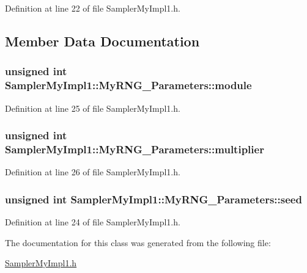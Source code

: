 Definition at line 22 of file Sampler\-My\-Impl1.\-h.



\subsection{Member Data Documentation}
\hypertarget{class_sampler_my_impl1_1_1_my_r_n_g___parameters_a7e4c25cb935ac5ecd7732028dbe4541f}{
\subsubsection[{module}]{\setlength{\rightskip}{0pt plus 5cm}unsigned int Sampler\-My\-Impl1\-::\-My\-R\-N\-G\-\_\-\-Parameters\-::module}}\label{class_sampler_my_impl1_1_1_my_r_n_g___parameters_a7e4c25cb935ac5ecd7732028dbe4541f}


Definition at line 25 of file Sampler\-My\-Impl1.\-h.

\hypertarget{class_sampler_my_impl1_1_1_my_r_n_g___parameters_a5038aa739c1c072931154d7d8c1a8cb0}{
\subsubsection[{multiplier}]{\setlength{\rightskip}{0pt plus 5cm}unsigned int Sampler\-My\-Impl1\-::\-My\-R\-N\-G\-\_\-\-Parameters\-::multiplier}}\label{class_sampler_my_impl1_1_1_my_r_n_g___parameters_a5038aa739c1c072931154d7d8c1a8cb0}


Definition at line 26 of file Sampler\-My\-Impl1.\-h.

\hypertarget{class_sampler_my_impl1_1_1_my_r_n_g___parameters_a4fd3cd31977ef5d606d31d2d68def258}{
\subsubsection[{seed}]{\setlength{\rightskip}{0pt plus 5cm}unsigned int Sampler\-My\-Impl1\-::\-My\-R\-N\-G\-\_\-\-Parameters\-::seed}}\label{class_sampler_my_impl1_1_1_my_r_n_g___parameters_a4fd3cd31977ef5d606d31d2d68def258}


Definition at line 24 of file Sampler\-My\-Impl1.\-h.



The documentation for this class was generated from the following file\-:\begin{DoxyCompactItemize}
\item 
\hyperlink{_sampler_my_impl1_8h}{Sampler\-My\-Impl1.\-h}\end{DoxyCompactItemize}

